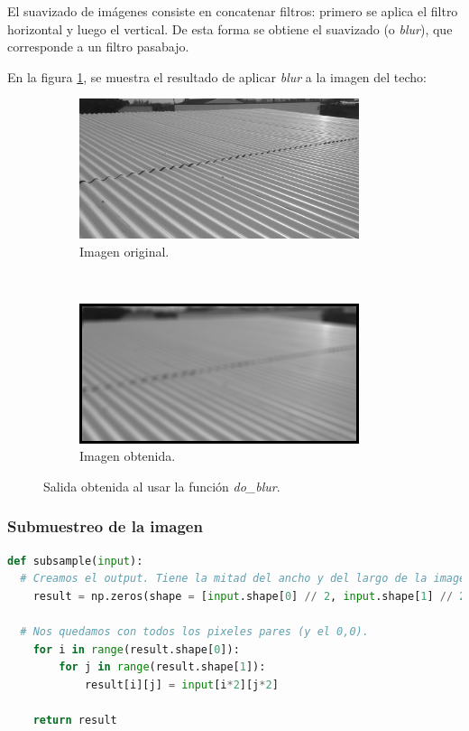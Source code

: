 \documentclass[12pt, letterpaper]{article}
\begin{document}
\par El suavizado de imágenes consiste en concatenar filtros: primero se aplica el filtro horizontal y luego el vertical. De esta forma se obtiene el suavizado (o \textit{blur}), que corresponde a un filtro pasabajo. 

\par En la figura \ref{blurtecho}, se muestra el resultado de aplicar \textit{blur} a la imagen del techo:

\begin{figure}[H]
  \centering
  \begin{subfigure}[t]{0.45\textwidth}
    \centering
    \includegraphics[width = 0.9\textwidth]{techo.png}
    \caption{Imagen original.}
  \end{subfigure}
  ~ 
  \begin{subfigure}[t]{0.45\textwidth}
      \centering
      \includegraphics[width = 0.9\textwidth]{conv/techoblur.png}
      \caption{Imagen obtenida.}
  \end{subfigure}
  \caption{Salida obtenida al usar la función \textit{do\_blur}.}
  \label{blurtecho}
\end{figure}

\subsubsection{Submuestreo de la imagen}
\begin{lstlisting}[language=Python, label = subsampleCode, caption=Submuestreo de imágenes.]
def subsample(input):
  # Creamos el output. Tiene la mitad del ancho y del largo de la imagen original. 
	result = np.zeros(shape = [input.shape[0] // 2, input.shape[1] // 2], dtype = np.float32)
  
  # Nos quedamos con todos los pixeles pares (y el 0,0).
	for i in range(result.shape[0]):
		for j in range(result.shape[1]):
			result[i][j] = input[i*2][j*2]
			
	return result
\end{lstlisting}
\end{document}
